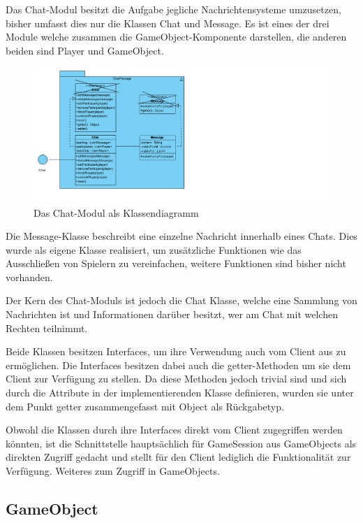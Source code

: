 \documentclass[fontsize=12pt,paper=a4,twoside]{scrartcl}
\begin{document}
Das Chat-Modul besitzt die Aufgabe jegliche Nachrichtensysteme umzusetzen, bisher umfasst dies nur die Klassen Chat und Message. Es ist eines der drei Module welche zusammen die GameObject-Komponente darstellen, die anderen beiden sind Player und GameObject.

\begin{figure}[h]
\centering
\includegraphics[width=1.0\linewidth]{ChatClass}
\caption{Das Chat-Modul als Klassendiagramm}
\label{fig:ChatClass}
\end{figure}

Die Message-Klasse beschreibt eine einzelne Nachricht innerhalb eines Chats. Dies wurde als eigene Klasse realisiert, um zusätzliche Funktionen wie das Ausschließen von Spielern zu vereinfachen, weitere Funktionen sind bisher nicht vorhanden.

Der Kern des Chat-Moduls ist jedoch die Chat Klasse, welche eine Sammlung von Nachrichten ist und Informationen darüber besitzt, wer am Chat mit welchen Rechten teilnimmt.

Beide Klassen besitzen Interfaces, um ihre Verwendung auch vom Client aus zu ermöglichen. Die Interfaces besitzen dabei auch die getter-Methoden um sie dem Client zur Verfügung zu stellen. Da diese Methoden jedoch trivial sind und sich durch die Attribute in der implementierenden Klasse definieren, wurden sie unter dem Punkt getter zusammengefasst mit Object als Rückgabetyp. 

Obwohl die Klassen durch ihre Interfaces direkt vom Client zugegriffen werden könnten, ist die Schnittstelle hauptsächlich für GameSession aus GameObjects als direkten Zugriff gedacht und stellt für den Client lediglich die Funktionalität zur Verfügung. Weiteres zum Zugriff in GameObjects.

\subsection{GameObject}
\end{document}
